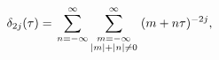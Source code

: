 \[\delta_{2j}(\tau)=\left.\sum_{n=-\infty}^{\infty}\sum_{\begin{subarray}{c}m=-%
\infty\\
\left|m\right|+\left|n\right|\neq 0\end{subarray}}^{\infty}\right.(m+n\tau)^{-%
2j},\]